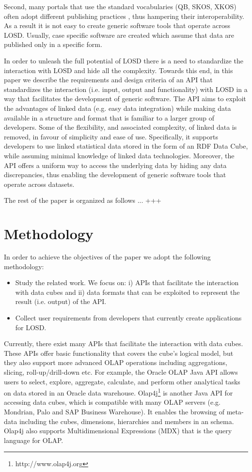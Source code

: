 \documentclass{llncs}
\begin{document}
Second, many portals that use the standard vocabularies (QB, SKOS, XKOS) often adopt different publishing practices \cite{KalampokisChallenges}, thus hampering their interoperability. As a result it is not easy to create generic software tools that operate across LOSD. Usually, case specific software \cite{KaramanouResultsSoFar} are created which assume that data are published only in a specific form. 

In order to unleash the full potential of LOSD there is a need to standardize the interaction with LOSD and hide all the complexity. Towards this end, in this paper we describe the requirements and design criteria of an API that standardizes the interaction (i.e. input, output and functionality) with LOSD in a way that facilitates the development of generic software. The API aims to exploit the advantages of linked data (e.g. easy data integration) while making data available in a structure and format that is familiar to a larger group of developers.  Some of the flexibility, and associated complexity, of linked data is removed, in favour of simplicity and ease of use. Specifically, it supports developers to use linked statistical data stored in the form of an RDF Data Cube, while assuming minimal knowledge of linked data technologies. Moreover, the API offers a uniform way to access the underlying data by hiding any data discrepancies, thus enabling the development of generic software tools that operate across datasets. 

The rest of the paper is organized as follows ... +++

\section{Methodology}\label{sec:methodology}

In order to achieve the objectives of the paper we adopt the following methodology:
\begin{itemize}
\item Study the related work. We focus on: i) APIs that facilitate the interaction with data cubes and ii) data formats that can be exploited to represent the result (i.e. output) of the API. 
\item Collect user requirements from developers that currently create applications for LOSD. 
\end{itemize}

Currently, there exist many APIs that facilitate the interaction with data cubes. These APIs offer basic functionality that covers the cube's logical model, but they also support more advanced OLAP operations including aggregations, slicing, roll-up/drill-down etc. For example, the Oracle OLAP Java API \cite{ORACLEAPI} allows users to select, explore, aggregate, calculate, and perform other analytical tasks on data stored in an Oracle data warehouse. Olap4j\footnote{http://www.olap4j.org} is another Java API for accessing data cubes, which is compatible with many OLAP servers (e.g. Mondrian, Palo and SAP Business Warehouse). It enables the browsing of meta-data including the cubes, dimensions, hierarchies and members in an schema. Olap4j also supports Multidimensional Expressions (MDX) that is the query language for OLAP.
\end{document}
